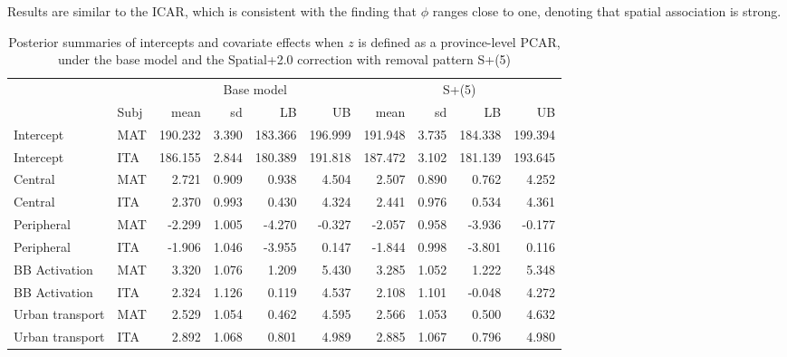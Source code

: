 \documentclass{book}
\begin{document}
\begin{appendices}
Results are similar to the ICAR, which is consistent with the finding that $\phi$ ranges close to one, denoting that spatial association is strong. %


\begin{table}[ht]
\centering
\begin{tabular}{ll|rrrr|rrrr}
  \hline
  && \multicolumn{4}{c|}{Base model} & \multicolumn{4}{c}{S+(5)}\\
 & Subj & mean & sd & LB & UB & mean & sd & LB & UB \\ 
  \hline
  Intercept & MAT & 190.232 & 3.390 & 183.366 & 196.999 & 191.948 & 3.735 & 184.338 & 199.394 \\ 
  Intercept & ITA & 186.155 & 2.844 & 180.389 & 191.818 & 187.472 & 3.102 & 181.139 & 193.645 \\  
  Central & MAT& 2.721 & 0.909 & 0.938 & 4.504 & 2.507 & 0.890 & 0.762 & 4.252 \\
  Central & ITA  & 2.370 & 0.993 & 0.430 & 4.324 & 2.441 & 0.976 & 0.534 & 4.361 \\ 
  Peripheral & MAT & -2.299 & 1.005 & -4.270 & -0.327 & -2.057 & 0.958 & -3.936 & -0.177 \\ 
  Peripheral & ITA & -1.906 & 1.046 & -3.955 & 0.147 & -1.844 & 0.998 & -3.801 & 0.116 \\ 
  BB Activation& MAT & 3.320 & 1.076 & 1.209 & 5.430 & 3.285 & 1.052 & 1.222 & 5.348 \\ 
  BB Activation & ITA & 2.324 & 1.126 & 0.119 & 4.537 & 2.108 & 1.101 & -0.048 & 4.272 \\ 
  Urban transport & MAT & 2.529 & 1.054 & 0.462 & 4.595 & 2.566 & 1.053 & 0.500 & 4.632 \\ 
  Urban transport & ITA & 2.892 & 1.068 & 0.801 & 4.989 & 2.885 & 1.067 & 0.796 & 4.980 \\    \hline
\end{tabular}
\caption{Posterior summaries of intercepts and covariate effects when $z$ is defined as a province-level PCAR, under the base model and the Spatial+2.0 correction with removal pattern S+(5)}
\label{tab:PCARfix}
\end{table}


\end{appendices}
\end{document}
